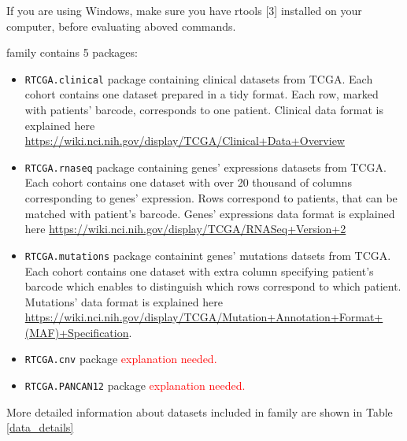 If you are using Windows, make sure you have rtools {[}3{]} installed on
your computer, before evaluating aboved commands.

 family contains 5 packages:

\begin{itemize}
\itemsep1pt\parskip0pt
\item
  \texttt{RTCGA.clinical} package containing clinical datasets from
  TCGA. Each cohort contains one dataset prepared in a tidy format. Each
  row, marked with patients' barcode, corresponds to one patient.
  Clinical data format is explained here
  \url{https://wiki.nci.nih.gov/display/TCGA/Clinical+Data+Overview}
\item
  \texttt{RTCGA.rnaseq} package containing genes' expressions datasets
  from TCGA. Each cohort contains one dataset with over 20 thousand of
  columns corresponding to genes' expression. Rows correspond to
  patients, that can be matched with patient's barcode. Genes'
  expressions data format is explained here
  \url{https://wiki.nci.nih.gov/display/TCGA/RNASeq+Version+2}
\item
  \texttt{RTCGA.mutations} package containint genes' mutations datsets
  from TCGA. Each cohort contains one dataset with extra column
  specifying patient's barcode which enables to distinguish which rows
  correspond to which patient. Mutations' data format is explained here
  \url{https://wiki.nci.nih.gov/display/TCGA/Mutation+Annotation+Format+(MAF)+Specification}.
\item
  \texttt{RTCGA.cnv} package \textcolor{red}{ explanation needed.}
\item
  \texttt{RTCGA.PANCAN12} package \textcolor{red}{ explanation needed.}
\end{itemize}

More detailed information about datasets included in 
family are shown in Table \ref{data_details}

\tiny

